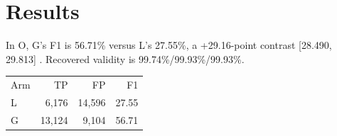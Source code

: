 \section{Results}
In O, G's F1 is 56.71\% versus L's 27.55\%, a +29.16-point contrast {[}28.490, 29.813{]} \cite{r4}.
Recovered validity is 99.74\%/99.93\%/99.93\%.
\begin{tabular}{lrrr}
Arm & TP & FP & F1 \\
L & 6,176 & 14,596 & 27.55 \\
G & 13,124 & 9,104 & 56.71 \\
\end{tabular}
